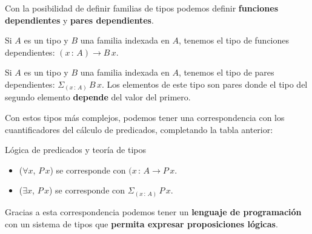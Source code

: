 \documentclass[xcolor=dvipsnames]{beamer} %
\newcommand{\tjud}[2]
  {\ensuremath{#1\,:\,#2}}
\newcommand{\depPair}[3]
 {\ensuremath{\Sigma_{(\tjud{#1}{#2})}\,#3\,#1}
 }
\begin{document}
\begin{frame}
 \begin{block}{}
  Con la posibilidad de definir familias de tipos podemos definir \textbf{funciones dependientes} y \textbf{pares dependientes}.
 \end{block}
 
 \pause
 
 \begin{block}{}
  Si $A$ es un tipo y $B$ una familia indexada en $A$, tenemos el tipo de funciones dependientes:
  $(\tjud{x}{A}) \rightarrow B\,x$.
 \end{block}
 
 \pause
 
 \begin{block}{}
  Si $A$ es un tipo y $B$ una familia indexada en $A$, tenemos el tipo de pares dependientes:
  $\depPair{x}{A}{B}$. Los elementos de este tipo son pares donde el tipo del segundo elemento \textbf{depende}
  del valor del primero.
 \end{block} 

 \pause
 
\end{frame}


\begin{frame}
 
   \begin{block}{}
  Con estos tipos más complejos, podemos tener una correspondencia con los cuantificadores del cálculo
  de predicados, completando la tabla anterior:
 \end{block}

 \pause

  \begin{block}{Lógica de predicados y teoría de tipos}
   \begin{itemize}
    \item ($\forall x$, $P\,x$) se corresponde con $(\tjud{x}{A} \rightarrow P\,x$.
    \item ($\exists x$, $P\,x$) se corresponde con $\depPair{x}{A}{P}$.
    \end{itemize}
  \end{block}

  \pause
  
  \begin{block}{}
   Gracias a esta correspondencia podemos tener un \textbf{lenguaje de programación} con un sistema
   de tipos que \textbf{permita expresar proposiciones lógicas}.
  \end{block}

\end{frame}
\end{document}
